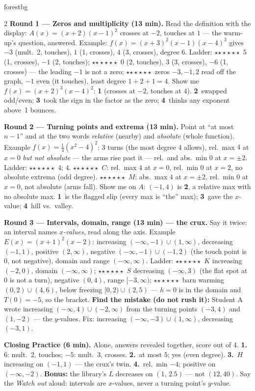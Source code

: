 \documentclass[10pt]{article}
\newcommand{\rung}[1]{{\color{goldacc}\ifcase#1\or$\star$\or$\star\star$\or$\star\star\star$\fi}}
\begin{document}
\begin{skillbox}{forestbg}
\begin{multicols}{2}
\textbf{Round 1 --- Zeros and multiplicity (13 min).} Read the definition with the display:
$A(x)=(x+2)(x-1)^2$ crosses at $-2$, touches at $1$ --- the warm-up's question, answered.
Example: $f(x)=(x+3)^2(x-1)(x-4)^3$ gives $-3$ (mult.~2, touches), $1$ (1, crosses), $4$ (3,
crosses), degree $6$. Ladder: \rung1\ $5$ (1, crosses), $-1$ (2, touches);
\rung2\ $0$ (2, touches), $3$ (3, crosses), $-6$ (1, crosses) --- the leading $-1$ is not a
zero; \rung3\ zeros $-3,-1,2$ read off the graph, $-1$ even (it touches), least degree
$1+2+1=4$. Show me $f(x)=(x+2)^3(x-4)^2$: \textbf{1} (crosses at $-2$, touches at $4$).
\textbf{2}~swapped odd/even; \textbf{3}~took the sign in the factor as the zero; \textbf{4}~thinks
any exponent above~1 bounces.

\textbf{Round 2 --- Turning points and extrema (13 min).} Point at ``at most $n-1$'' and at the
two words \emph{relative} (nearby) and \emph{absolute} (whole function). Example $f(x)=\tfrac14(x^2-4)^2$:
3 turns (the most degree 4 allows), rel.\ max $4$ at $x=0$ \emph{but not absolute} --- the arms
rise past it --- rel.\ and abs.\ min $0$ at $x=\pm2$. Ladder: \rung1\ $4$; $4$.
\rung2\ $C$: rel.\ max $4$ at $x=0$, rel.\ min $0$ at $x=2$, no absolute extrema (odd degree).
\rung3\ $M$: abs.\ max $4$ at $x=\pm2$, rel.\ min $0$ at $x=0$, not absolute (arms fall).
Show me on $A$: $(-1,4)$ is \textbf{2}, a relative max with no absolute max. \textbf{1}~is the
flagged slip (every max is ``the'' max); \textbf{3}~gave the $x$-value; \textbf{4}~hill vs.\ valley.

\columnbreak
\textbf{Round 3 --- Intervals, domain, range (13 min) --- the crux.} Say it twice: an interval
names \emph{$x$-values}, read along the axis. Example $E(x)=(x+1)^2(x-2)$: increasing
$(-\infty,-1)\cup(1,\infty)$, decreasing $(-1,1)$, positive $(2,\infty)$, negative
$(-\infty,-1)\cup(-1,2)$ (the touch point is $0$, not negative), domain and range
$(-\infty,\infty)$. Ladder: \rung1\ $K$ increasing $(-2,0)$, domain $(-\infty,\infty)$;
\rung2\ $S$ decreasing $(-\infty,3)$ (the flat spot at $0$ is not a turn), negative $(0,4)$,
range $[-3,\infty)$; \rung3\ barn warming $(0,2)\cup(4,6)$, below freezing $[0,2)\cup(2,5)$ ---
$h=0$ is in the domain and $T(0)=-5$, so the bracket. \textbf{Find the mistake (do not rush
it):} Student A wrote increasing $(-\infty,4)\cup(-2,\infty)$ from the turning points
$(-3,4)$ and $(1,-2)$ --- the $y$-values. Fix: increasing $(-\infty,-3)\cup(1,\infty)$,
decreasing $(-3,1)$.

\textbf{Closing Practice (6 min).} Alone, answers revealed together, score out of 4.
\textbf{1.}~$6$: mult.~2, touches; $-5$: mult.~3, crosses. \textbf{2.}~at most $5$; yes (even
degree). \textbf{3.}~$H$ increasing on $(-1,1)$ --- the crux's twin. \textbf{4.}~rel.\ min $-4$;
positive on $(-\infty,-2)$. \textbf{Bonus:} the library's $L$ decreases on $(1,\,2.5)$ --- not
$(12,40)$. Say the \emph{Watch out} aloud: intervals are $x$-values, never a turning point's
$y$-value.
\end{multicols}
\end{skillbox}
\end{document}
